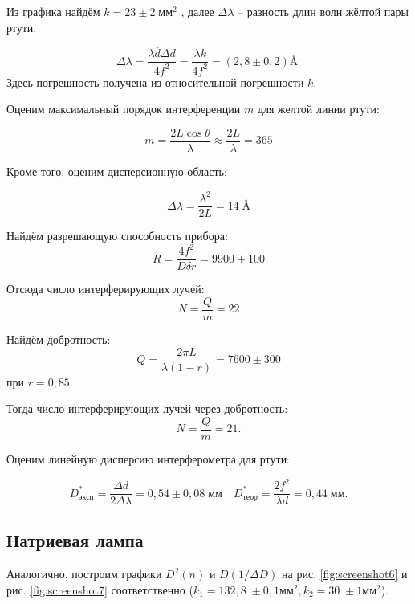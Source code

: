 \documentclass[12pt,a4paper]{extreport}
\begin{document}
Из графика найдём $k = 23 \pm 2 \; \text{мм}^2$ , далее $ \Delta \lambda $ -- разность длин волн жёлтой пары ртути.

\begin{equation*}\label{key}
	\Delta \lambda = \frac{\lambda \overline{d} \Delta d}{4 f^2} = \frac{\lambda k}{4f^2} = (2,8 \pm 0,2) \si{\angstrom} \; 
\end{equation*}
Здесь погрешность получена из относительной погрешности $ k $.


Оценим максимальный порядок интерференции $m$ для желтой линии ртути:

\[
m = \frac{2L \cos \theta}{\lambda} \approx \frac{2L}{\lambda} = 365
\]

Кроме того, оценим дисперсионную область:

\[ \Delta \lambda = \frac{\lambda^2}{2 L}= 14 \; \si{\angstrom} \]

Найдём разрешающую способность прибора:
\[ R = \frac{4f^2}{D \delta r} = 9900 \pm 100 \]

Отсюда число интерферирующих лучей: 
\[N = \frac{Q}{m} = 22\]

Найдём добротность:
\[ Q = \frac{2 \pi L}{\lambda (1 - r)} = 7600 \pm 300\]
при $ r=0,85.$


Тогда число интерферирующих лучей через добротность: 
\[N = \frac{Q}{m} = 21.\]

Оценим линейную дисперсию интерферометра для ртути:

\[ D^*_{эксп} = \frac{\Delta d}{2 \Delta \lambda} = 0,54\pm 0,08 \; мм \quad  D^*_{теор} = \frac{2f^2}{\lambda d} = 0,44 \; мм.\]

\subsection{Натриевая лампа}

Аналогично, построим графики $ D^2(n) $ и $ \overline{D}(1/\Delta D) $ на рис. \ref{fig:screenshot6} и рис. \ref{fig:screenshot7} соответственно ($k_1 = 132,8 \; \pm 0,1 \text{мм}^2, k_2 = 30 \; \pm 1 \text{мм}^2$).
\end{document}
